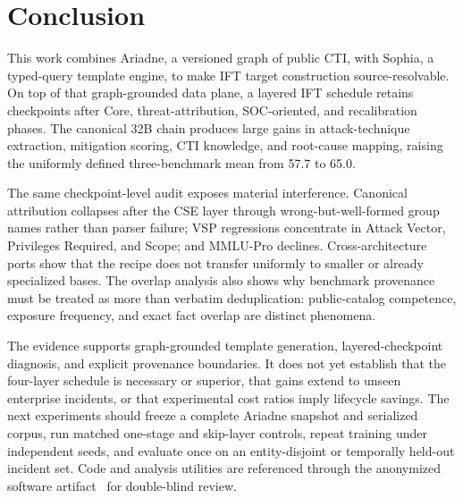 \documentclass[conference]{IEEEtran}
\begin{document}
\section{Conclusion}
This work combines Ariadne, a versioned graph of public CTI, with Sophia, a typed-query template engine, to make IFT target construction source-resolvable. On top of that graph-grounded data plane, a layered IFT schedule retains checkpoints after Core, threat-attribution, SOC-oriented, and recalibration phases. The canonical 32B chain produces large gains in attack-technique extraction, mitigation scoring, CTI knowledge, and root-cause mapping, raising the uniformly defined three-benchmark mean from 57.7 to 65.0.

The same checkpoint-level audit exposes material interference. Canonical attribution collapses after the CSE layer through wrong-but-well-formed group names rather than parser failure; VSP regressions concentrate in Attack Vector, Privileges Required, and Scope; and MMLU-Pro declines. Cross-architecture ports show that the recipe does not transfer uniformly to smaller or already specialized bases. The overlap analysis also shows why benchmark provenance must be treated as more than verbatim deduplication: public-catalog competence, exposure frequency, and exact fact overlap are distinct phenomena.

The evidence supports graph-grounded template generation, layered-checkpoint diagnosis, and explicit provenance boundaries. It does not yet establish that the four-layer schedule is necessary or superior, that gains extend to unseen enterprise incidents, or that experimental cost ratios imply lifecycle savings. The next experiments should freeze a complete Ariadne snapshot and serialized corpus, run matched one-stage and skip-layer controls, repeat training under independent seeds, and evaluate once on an entity-disjoint or temporally held-out incident set. Code and analysis utilities are referenced through the anonymized software artifact~\cite{anonartifact} for double-blind review.



\end{document}
